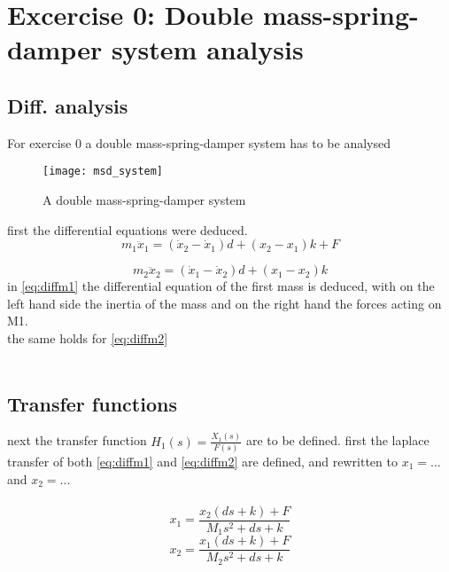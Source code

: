 \chapter{Excercise 0: Double mass-spring-damper system analysis}
\section{Diff. analysis}

For exercise 0 a double mass-spring-damper system has to be analysed

\begin{figure}[H]
	\texttt{[image: msd\_system]}
	\centering
	\caption{A double mass-spring-damper system}
	\label{fig:intro_system}
\end{figure}
first the differential equations were deduced.\\

\begin{equation}
\label{eq:diffm1}
{ m }_{ 1 }{ \ddot { x }  }_{ 1 }=({ \dot { x }  }_{ 2 }-\dot { x } _{ 1 })d+({ x }_{ 2 }-{ x }_{ 1 })k+F
\end{equation}

\begin{equation}
\label{eq:diffm2}
{ m }_{ 2 }{ \ddot { x }  }_{ 2 }=({ \dot { x }  }_{ 1 }-\dot { x } _{ 2 })d+({ x }_{ 1 }-{ x }_{ 2 })k
\end{equation}
in \eqref{eq:diffm1} the differential equation of the first mass is deduced, with on the left hand side the inertia of the mass and on the right hand the forces acting on M1.\\
the same holds for \eqref{eq:diffm2}\\
\\
\section{Transfer functions}
next the transfer function ${ H }_{ 1 }(s)=\frac { { X }_{ 1 }(s) }{ F(s) } $ are to be defined. first the laplace transfer of both \eqref{eq:diffm1} and \eqref{eq:diffm2} are defined, and rewritten to $x_1=...$ and $x_2=...$\\
\\

\begin{equation}
\label{eq:lap_x1}
x_1=\frac{x_2(ds+k)+F}{M_1s^2+ds+k}
\end{equation}
\begin{equation}
\label{eq:lap_x2}
x_2=\frac{x_1(ds+k)+F}{M_2s^2+ds+k}
\end{equation}


